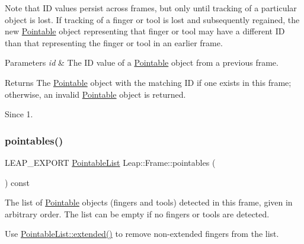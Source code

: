 \begin{DoxyCodeInclude}
\end{DoxyCodeInclude}


Note that ID values persist across frames, but only until tracking of a particular object is lost. If tracking of a finger or tool is lost and subsequently regained, the new \hyperlink{class_leap_1_1_pointable}{Pointable} object representing that finger or tool may have a different ID than that representing the finger or tool in an earlier frame.


\begin{DoxyParams}{Parameters}
{\em id} & The ID value of a \hyperlink{class_leap_1_1_pointable}{Pointable} object from a previous frame. \\
\hline
\end{DoxyParams}
\begin{DoxyReturn}{Returns}
The \hyperlink{class_leap_1_1_pointable}{Pointable} object with the matching ID if one exists in this frame; otherwise, an invalid \hyperlink{class_leap_1_1_pointable}{Pointable} object is returned. 
\end{DoxyReturn}
\begin{DoxySince}{Since}
1. 
\end{DoxySince}
\mbox{\label{class_leap_1_1_frame_ae6c7c77ae805bdc6fc30381fa2b2ae3e}} 
\subsubsection{\texorpdfstring{pointables()}{pointables()}}
{\footnotesize\ttfamily L\+E\+A\+P\+\_\+\+E\+X\+P\+O\+RT \hyperlink{class_leap_1_1_pointable_list}{Pointable\+List} Leap\+::\+Frame\+::pointables (\begin{DoxyParamCaption}{ }\end{DoxyParamCaption}) const}

The list of \hyperlink{class_leap_1_1_pointable}{Pointable} objects (fingers and tools) detected in this frame, given in arbitrary order. The list can be empty if no fingers or tools are detected.

Use \hyperlink{class_leap_1_1_pointable_list_a47919c7b8198806da5af4c7d351d83fc}{Pointable\+List\+::extended()} to remove non-\/extended fingers from the list.


\begin{DoxyCodeInclude}
\end{DoxyCodeInclude}


